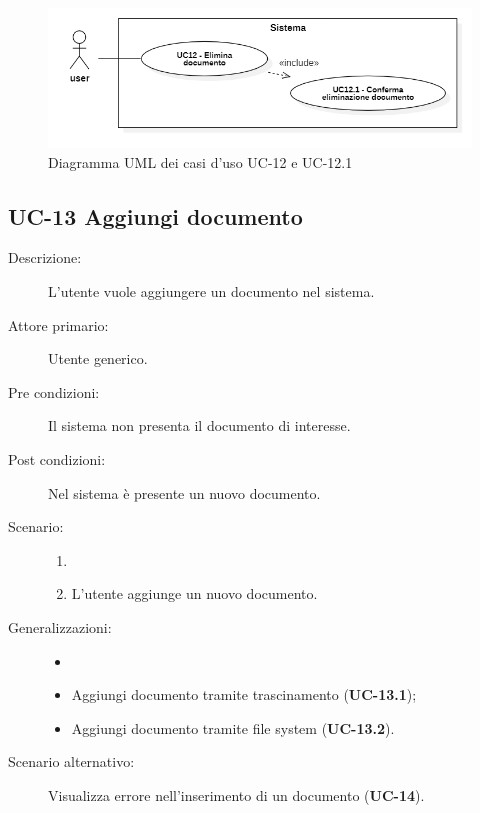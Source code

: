 \begin{figure}[H]
    \centering
    \includegraphics[width=0.8\linewidth]{UC12.PNG} %
    \caption{Diagramma UML dei casi d'uso UC-12 e UC-12.1}
    \label{fig:UC10-11}
\end{figure}

\subsection{UC-13 Aggiungi documento}
\begin{description}
    \item[Descrizione:] L'utente vuole aggiungere un documento nel sistema.
    \item[Attore primario:] Utente generico.
    \item[Pre condizioni:] Il sistema non presenta il documento di interesse.
    \item[Post condizioni:] Nel sistema è presente un nuovo documento.
    \item[Scenario:]
    \begin{enumerate}
        \item[]
        \item L’utente aggiunge un nuovo documento.
    \end{enumerate}
    \item[Generalizzazioni:] 
    \begin{itemize}
        \item[] 
        \item Aggiungi documento tramite trascinamento (\textbf{UC-13.1});
        \item Aggiungi documento tramite file system (\textbf{UC-13.2}).
    \end{itemize} 
    \item[Scenario alternativo:] Visualizza errore nell'inserimento di un documento (\textbf{UC-14}).
\end{description}

